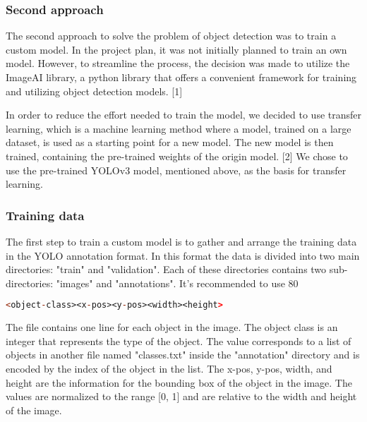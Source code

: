 \subsubsection{Second approach}

The second approach to solve the problem of object detection was to train a custom model. In the project plan, it was not initially planned to train an own model. However, to streamline the process, the decision was made to utilize the ImageAI library, a python library that offers a convenient framework for training and utilizing object detection models. [1]

In order to reduce the effort needed to train the model, we decided to use transfer learning, which is a machine learning method where a model, trained on a large dataset, is used as a starting point for a new model. The new model is then trained, containing the pre-trained weights of the origin model. [2] We chose to use the pre-trained YOLOv3 model, mentioned above, as the basis for transfer learning. 

\subsubsection{Training data }

The first step to train a custom model is to gather and arrange the training data in the YOLO annotation format. In this format the data is divided into two main directories: "train" and "validation". Each of these directories contains two sub-directories: "images" and "annotations". It's recommended to use 80%

\begin{lstlisting}[language=prolog]
<object-class><x-pos><y-pos><width><height>
\end{lstlisting}

The file contains one line for each object in the image. The object class is an integer that represents the type of the object. The value corresponds to a list of objects in another file named "classes.txt" inside the "annotation" directory and is encoded by the index of the object in the list. The x-pos, y-pos, width, and height are the information for the bounding box of the object in the image. The values are normalized to the range [0, 1] and are relative to the width and height of the image.

